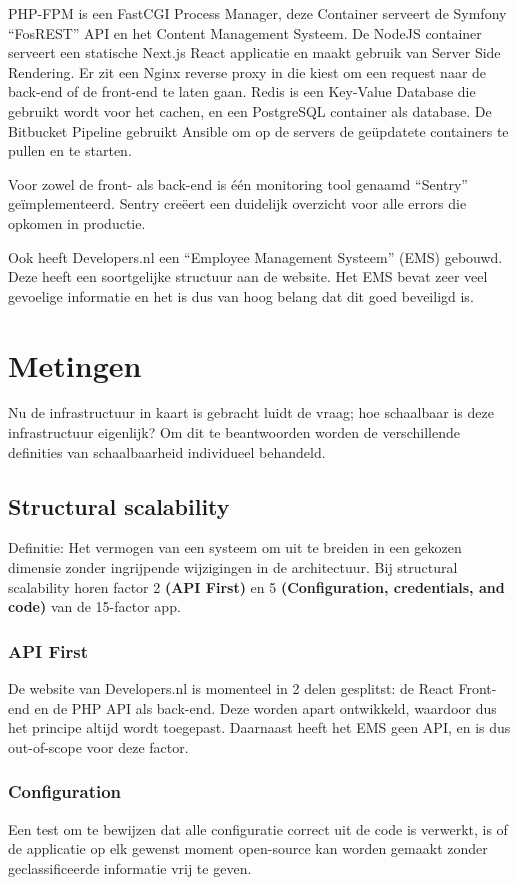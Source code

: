 PHP-FPM is een FastCGI Process Manager, deze Container serveert de Symfony “FosREST” API en het Content Management Systeem. De NodeJS container serveert een statische Next.js React applicatie en maakt gebruik van Server Side Rendering. Er zit een Nginx reverse proxy in die kiest om een request naar de back-end of de front-end te laten gaan. Redis is een Key-Value Database die gebruikt wordt voor het cachen, en een PostgreSQL container als database. De Bitbucket Pipeline gebruikt Ansible om op de servers de geüpdatete containers te pullen en te starten.

Voor zowel de front- als back-end is één monitoring tool genaamd \enquote{Sentry} geïmplementeerd. Sentry creëert een duidelijk overzicht voor alle errors die opkomen in productie.

Ook heeft Developers.nl een \enquote{Employee Management Systeem} (EMS) gebouwd. Deze heeft een soortgelijke structuur aan de website. Het EMS bevat zeer veel gevoelige informatie en het is dus van hoog belang dat dit goed beveiligd is.

\section{Metingen}

Nu de infrastructuur in kaart is gebracht luidt de vraag; hoe schaalbaar is deze infrastructuur eigenlijk? Om dit te beantwoorden worden de verschillende definities van schaalbaarheid individueel behandeld.

\subsection{Structural scalability}
Definitie: Het vermogen van een systeem om uit te breiden in een gekozen dimensie zonder ingrijpende wijzigingen in de architectuur. Bij structural scalability horen factor 2 \textbf{(API First)} en 5 \textbf{(Configuration, credentials, and code)} van de 15-factor app.

\subsubsection{API First}
De website van Developers.nl is momenteel in 2 delen gesplitst: de React Front-end en de PHP API als back-end. Deze worden apart ontwikkeld, waardoor dus het principe altijd wordt toegepast. Daarnaast heeft het EMS geen API, en is dus out-of-scope voor deze factor.

\subsubsection{Configuration}
Een test om te bewijzen dat alle configuratie correct uit de code is verwerkt, is of de applicatie op elk gewenst moment open-source kan worden gemaakt zonder geclassificeerde informatie vrij te geven.

